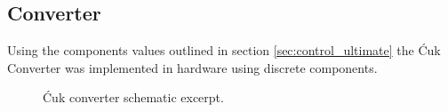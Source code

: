 \subsection{Converter}
Using the components values outlined in section \ref{sec:control_ultimate} the \'Cuk Converter was implemented in hardware using discrete components.
\begin{figure}
\centering
    \caption{\'Cuk converter schematic excerpt.}
    \label{fig:converter_schematic}
\end{figure}